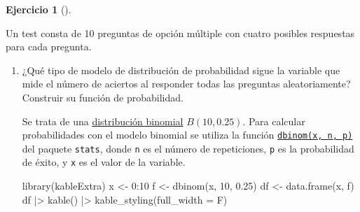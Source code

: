 \documentclass[
  a4paper,
]{scrreport}
\newenvironment{Shaded}{\begin{snugshade}}{\end{snugshade}}
\newcommand{\AttributeTok}[1]{\textcolor[rgb]{0.40,0.45,0.13}{#1}}
\newcommand{\DecValTok}[1]{\textcolor[rgb]{0.68,0.00,0.00}{#1}}
\newcommand{\FloatTok}[1]{\textcolor[rgb]{0.68,0.00,0.00}{#1}}
\newcommand{\FunctionTok}[1]{\textcolor[rgb]{0.28,0.35,0.67}{#1}}
\newcommand{\NormalTok}[1]{\textcolor[rgb]{0.00,0.23,0.31}{#1}}
\newcommand{\OtherTok}[1]{\textcolor[rgb]{0.00,0.23,0.31}{#1}}
\newcommand{\SpecialCharTok}[1]{\textcolor[rgb]{0.37,0.37,0.37}{#1}}
\theoremstyle{definition}
\newtheorem{exercise}{Ejercicio}[chapter]
\theoremstyle{remark}
\begin{document}
\begin{exercise}[]\protect\hypertarget{exr-distribuciones-probabilidad-2}{}\label{exr-distribuciones-probabilidad-2}

Un test consta de 10 preguntas de opción múltiple con cuatro posibles
respuestas para cada pregunta.

\begin{enumerate}
\def\labelenumi{\alph{enumi}.}
\item
  ¿Qué tipo de modelo de distribución de probabilidad sigue la variable
  que mide el número de aciertos al responder todas las preguntas
  aleatoriamente? Construir su función de probabilidad.

  \begin{tcolorbox}[enhanced jigsaw, coltitle=black, left=2mm, colback=white, leftrule=.75mm, toptitle=1mm, breakable, bottomrule=.15mm, titlerule=0mm, bottomtitle=1mm, title=\textcolor{quarto-callout-tip-color}{\faLightbulb}\hspace{0.5em}{Solución}, arc=.35mm, toprule=.15mm, rightrule=.15mm, colframe=quarto-callout-tip-color-frame, opacityback=0, colbacktitle=quarto-callout-tip-color!10!white, opacitybacktitle=0.6]

  Se trata de una
  \href{https://es.wikipedia.org/wiki/Distribuci\%C3\%B3n_binomial}{distribución
  binomial} \(B(10, 0.25)\). Para calcular probabilidades con el modelo
  binomial se utiliza la función
  \href{https://www.rdocumentation.org/packages/stats/versions/3.3/topics/Binomial}{\texttt{dbinom(x,\ n,\ p)}}
  del paquete \texttt{stats}, donde \texttt{n} es el número de
  repeticiones, \texttt{p} es la probabilidad de éxito, y \texttt{x} es
  el valor de la variable.

\begin{Shaded}
\begin{Highlighting}[]
\FunctionTok{library}\NormalTok{(kableExtra)}
\NormalTok{x }\OtherTok{\textless{}{-}} \DecValTok{0}\SpecialCharTok{:}\DecValTok{10}
\NormalTok{f }\OtherTok{\textless{}{-}} \FunctionTok{dbinom}\NormalTok{(x, }\DecValTok{10}\NormalTok{, }\FloatTok{0.25}\NormalTok{)}
\NormalTok{df }\OtherTok{\textless{}{-}} \FunctionTok{data.frame}\NormalTok{(x, f)}
\NormalTok{df }\SpecialCharTok{|\textgreater{}} 
    \FunctionTok{kable}\NormalTok{() }\SpecialCharTok{|\textgreater{}} 
    \FunctionTok{kable\_styling}\NormalTok{(}\AttributeTok{full\_width =}\NormalTok{ F)}
\end{Highlighting}
\end{Shaded}


\end{tcolorbox}
\end{enumerate}
\end{exercise}
\end{document}
